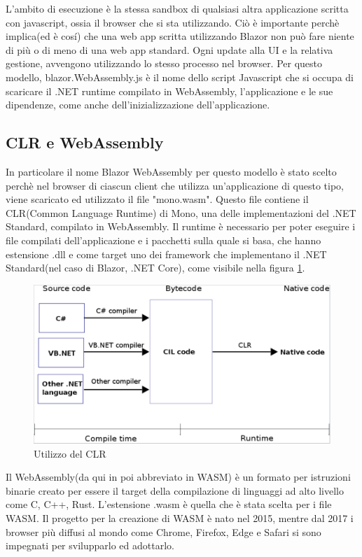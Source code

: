 L'ambito di esecuzione \`e la stessa sandbox di qualsiasi altra applicazione scritta con javascript, ossia il browser che si sta utilizzando.
Ci\`o \`e importante perch\`e implica(ed \`e cos\'i) che una web app scritta utilizzando Blazor non pu\`o fare niente di pi\`u o di meno di una web app standard.
Ogni update alla UI e la relativa gestione, avvengono utilizzando lo stesso processo nel browser.
Per questo modello, blazor.WebAssembly.js \`e il nome dello script Javascript che si occupa di scaricare il .NET runtime compilato in WebAssembly, l'applicazione e le sue dipendenze, come anche dell'inizializzazione dell'applicazione.

\subsection{CLR e WebAssembly}\label{sez:webAssembly}
In particolare il nome Blazor WebAssembly per questo modello \`e stato scelto perch\`e nel browser di ciascun client che utilizza un'applicazione di questo tipo, viene scaricato ed utilizzato il file "mono.wasm".
Questo file contiene il CLR(Common Language Runtime) di Mono, una delle implementazioni del .NET Standard, compilato in WebAssembly.
Il runtime \`e necessario per poter eseguire i file compilati dell'applicazione e i pacchetti sulla quale si basa, che hanno estensione .dll e come target uno dei framework che implementano il .NET Standard(nel caso di Blazor, .NET Core), come visibile nella figura \ref{fig:CLR}.

\begin{figure}[H]
	\centerline{\includegraphics[scale=0.5]{figure/CLR.PNG}}
	\caption{Utilizzo del CLR}
	\label{fig:CLR}
\end{figure}

Il WebAssembly(da qui in poi abbreviato in WASM) \`e un formato per istruzioni binarie creato per essere il target della compilazione di linguaggi ad alto livello come C, C++, Rust\cite{webAssemblyOfficialWebsite}.
L'estensione .wasm \`e quella che \`e stata scelta per i file WASM.
Il progetto per la creazione di WASM \`e nato nel 2015, mentre dal 2017 i browser pi\`u diffusi al mondo come Chrome, Firefox, Edge e Safari si sono impegnati per svilupparlo ed adottarlo.\cite{webAssemblySupport}

